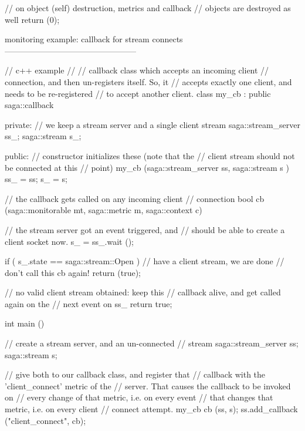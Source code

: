 \begin{mycode}
{      // on object (self) destruction, metrics and callback
      // objects are destroyed as well
      return (0);
    }
 
 
 
  monitoring example: callback for stream connects
  ------------------------------------------------
 
    // c++ example
    //
    // callback class which accepts an incoming client
    // connection, and then un-registers itself.  So, it
    // accepts exactly one client, and needs to be re-registered
    // to accept another client.
    class my_cb : public saga::callback
    {
      private:
        // we keep a stream server and a single client stream
        saga::stream_server ss_;
        saga::stream        s_;
 
 
      public:
        // constructor initializes these (note that the
        // client stream should not be connected at this
        // point)
        my_cb (saga::stream_server ss,
               saga::stream        s )
        {
          ss_ = ss;
          s_  = s;
        }
 
 
        // the callback gets called on any incoming client
        // connection
        bool cb (saga::monitorable mt, 
                 saga::metric      m, 
                 saga::context     c)
        {
          // the stream server got an event triggered, and
          // should be able to create a client socket now.
          s_ = ss_.wait ();
 
          if ( s_.state == saga::stream::Open )
          {
            // have a client stream, we are done
            // don't call this cb again!
            return (true);
          }
 
          // no valid client stream obtained: keep this
          // callback alive, and get called again on the
          // next event on ss_
          return true;
        }
     }
 
     int main ()
     {
       // create a stream server, and an un-connected
       // stream
       saga::stream_server ss;
       saga::stream        s;
 
       // give both to our callback class, and register that
       // callback with the 'client_connect' metric of the
       // server.  That causes the callback to be invoked on
       // every change of that metric, i.e. on every event
       // that changes that metric, i.e. on every client
       // connect attempt.
       my_cb cb (ss, s);
       ss.add_callback ("client_connect", cb);
 
}
\end{mycode}
